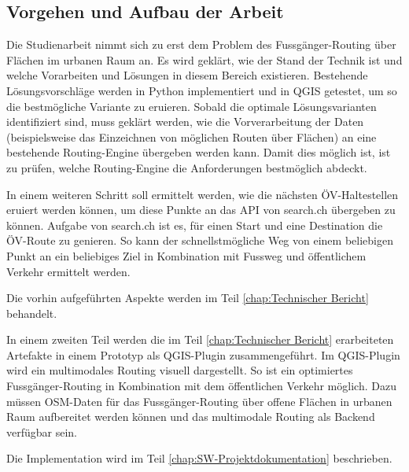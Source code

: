 \subsection{Vorgehen und Aufbau der Arbeit}
\label{Vorgehen und Aufbau der Arbeit}
Die Studienarbeit nimmt sich zu erst dem Problem des Fussgänger-Routing über Flächen im urbanen Raum an. Es wird geklärt, wie der Stand der Technik ist und welche Vorarbeiten und Lösungen in diesem Bereich existieren. Bestehende Lösungsvorschläge werden in Python implementiert und in \gls{QGIS} getestet, um so die bestmögliche Variante zu eruieren. Sobald die optimale Lösungsvarianten identifiziert sind, muss geklärt werden, wie die Vorverarbeitung der Daten (beispielsweise das Einzeichnen von möglichen Routen über Flächen) an eine bestehende Routing-Engine übergeben werden kann. Damit dies möglich ist, ist zu prüfen, welche Routing-Engine die Anforderungen bestmöglich abdeckt.

In einem weiteren Schritt soll ermittelt werden, wie die nächsten ÖV-Haltestellen eruiert werden können, um diese Punkte an das \ac{API} von search.ch \cite{search_ch_route_api} übergeben zu können. Aufgabe von search.ch ist es, für einen Start und eine Destination die ÖV-Route zu genieren. So kann der schnellstmögliche Weg von einem beliebigen Punkt an ein beliebiges Ziel in Kombination mit Fussweg und öffentlichem Verkehr ermittelt werden.

Die vorhin aufgeführten Aspekte werden im Teil \ref{chap:Technischer Bericht} behandelt.

In einem zweiten Teil werden die im Teil \ref{chap:Technischer Bericht} erarbeiteten Artefakte in einem Prototyp als QGIS-Plugin zusammengeführt. Im QGIS-Plugin wird ein multimodales Routing visuell dargestellt. So ist ein optimiertes Fussgänger-Routing in Kombination mit dem öffentlichen Verkehr möglich. Dazu müssen \ac{OSM}-Daten für das Fussgänger-Routing über offene Flächen in urbanen Raum aufbereitet werden können und das multimodale Routing als Backend verfügbar sein.

Die Implementation wird im Teil \ref{chap:SW-Projektdokumentation} beschrieben.
